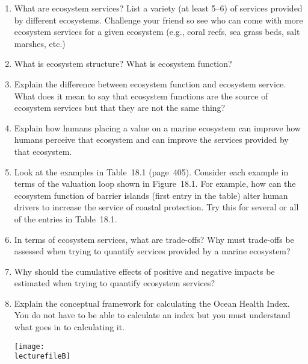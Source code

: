 \documentclass[letterpaper]{tufte-handout}
\newcommand\lecturefileB{434_lecture02_instructor}
\begin{document}
\begin{enumerate}

	\item What are ecosystem services?%
	List a variety (at least 5–6) of services 
	provided by different ecosystems. Challenge your friend so see who can come 
	with more ecosystem services for a given ecosystem (e.g., coral reefs, sea
	grass beds, salt marshes, etc.)
	
	\item What is ecosystem structure? What is ecosystem function?
	
	\item Explain the difference between ecosystem function and ecosystem service.
	What does it mean to say that ecosystem functions are the source of 
	ecosystem services but that they are not the same thing?
	
	\item Explain%
	how humans placing a value on a marine ecosystem can improve how 
	humans perceive that ecosystem and can improve the services provided by that
	ecosystem.
	
	\item Look at the examples in Table~18.1 (page~405). Consider each example
	in terms of the valuation loop shown in Figure~18.1. For example, how
	can the ecosystem function of barrier islands (first entry in the table)
	alter human drivers to increase the service of coastal protection. Try this
	for several or all of the entries in Table~18.1.
	
	\item In terms of ecosystem services, what are trade-offs? Why must trade-offs 
	be assessed when trying to quantify services provided by a marine ecosystem?
	
	\item Why%
	should the cumulative effects of positive and negative impacts be
	estimated when trying to quantify ecosystem services?
	
	\item Explain%
	the conceptual framework for calculating the Ocean Health Index. You do not
	have to be able to calculate an index but you must understand what goes in
	to calculating it.

	\begin{marginfigure}
	\texttt{[image: \\lecturefileB]}
	\end{marginfigure}
	

\end{enumerate}
\end{document}
